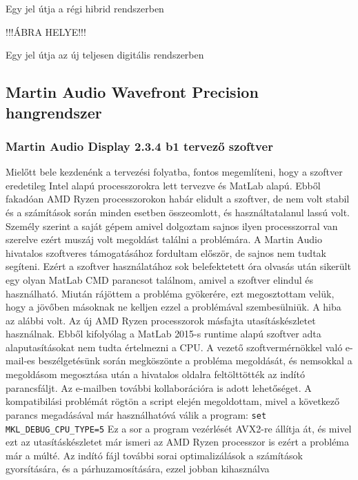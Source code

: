Egy jel útja a régi hibrid rendszerben


!!!ÁBRA HELYE!!!

Egy jel útja az új teljesen digitális rendszerben

\subsection{Martin Audio Wavefront Precision hangrendszer}
\subsubsection{Martin Audio Display 2.3.4 b1 tervező szoftver}
Mielőtt bele kezdenénk a tervezési folyatba, fontos megemlíteni, hogy a szoftver 
eredetileg Intel alapú processzorokra lett tervezve és MatLab alapú. Ebből fakadóan
AMD Ryzen processzorokon habár elidult a szoftver, de nem volt stabil és a számítások során
minden esetben összeomlott, és használtatalanul lassú volt. Személy szerint a saját gépem amivel dolgoztam
sajnos ilyen processzorral van szerelve ezért muszáj volt megoldást találni a problémára.
A Martin Audio hivatalos szoftveres támogatásához fordultam először, de sajnos nem tudtak segíteni.
Ezért a szoftver használatához
sok belefektetett óra olvasás után sikerült egy olyan MatLab CMD parancsot találnom, amivel
a szoftver elindul és használható. 
Miután rájöttem a probléma gyökerére, ezt megosztottam velük, hogy a jövőben másoknak ne kelljen
ezzel a problémával szembesülniük. 
A hiba az alábbi volt. Az új AMD Ryzen processzorok másfajta utasításkészletet használnak. 
Ebből kifolyólag a MatLab 2015-s runtime alapú szoftver adta alaputasításokat nem tudta értelmezni a CPU.
A vezető szoftvermérnökkel való e-mail-es beszélgetésünk során megköszönte a probléma
megoldását, és nemsokkal a megoldásom megosztása után a hivatalos oldalra feltölttötték
az indító parancsfáljt. Az e-mailben további kollaborációra is adott lehetőséget.
A kompatibilási problémát rögtön a script elején megoldottam,
mivel a következő parancs megadásával már használhatóvá válik a program: \texttt{set MKL\_DEBUG\_CPU\_TYPE=5} \newline
Ez a sor a program vezérlését AVX2-re állítja át, és mivel ezt az utasításkészletet már ismeri az AMD Ryzen processzor
is ezért a probléma már a múlté.
Az indító fájl további sorai optimalizálások a számítások gyorsítására, és a párhuzamosítására, ezzel jobban kihasználva
